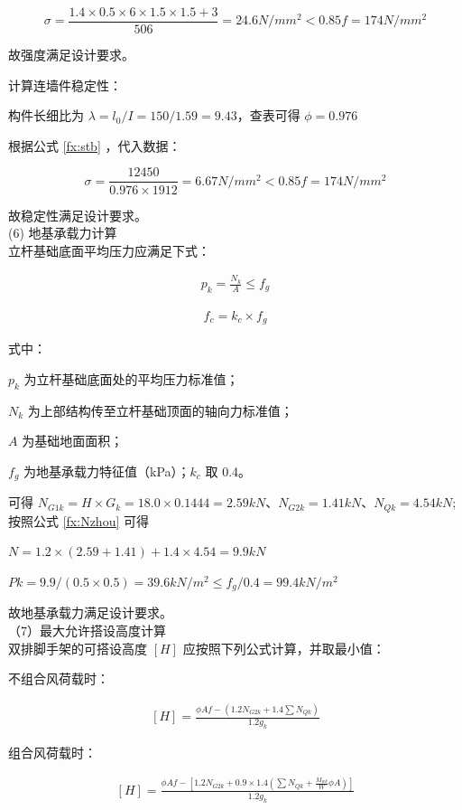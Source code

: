 $$\sigma=\frac{1.4×0.5×6×1.5×1.5+3}{506}=24.6 N/mm^2<0.85f=174 N/mm^2$$

故强度满足设计要求。

计算连墙件稳定性：

构件长细比为 $\lambda =l_0/I=150/1.59=9.43$，查表可得 $\phi=0.976$

根据公式 \ref{fx:stb} ，代入数据：

$$\sigma =\frac{12450}{0.976\times 1912}=6.67 N/mm^2<0.85f=174 N/mm^2$$

故稳定性满足设计要求。\\

(6) 地基承载力计算\\

立杆基础底面平均压力应满足下式：

\begin{align}
    p_k=\frac{N_k}{A} \leq f_g
\end{align}

\begin{align}
    f_c=k_c\times f_{g}
\end{align}

式中：

$p_k$ 为立杆基础底面处的平均压力标准值；   

$N_k$ 为上部结构传至立杆基础顶面的轴向力标准值； 

$A$ 为基础地面面积；                       

$f_g$ 为地基承载力特征值（kPa）；$k_c$ 取 0.4。

可得 $N_{G1k}=H\times G_k=18.0\times 0.1444=2.59kN$、$N_{G2k}=1.41kN$、$N_{Qk}=4.54kN$;
按照公式 \ref{fx:Nzhou} 可得

$N=1.2\times (2.59+1.41)+1.4\times 4.54=9.9kN $

$Pk=9.9/(0.5×0.5)=39.6kN/m^2\leq f_g/0.4=99.4kN/m^2$

故地基承载力满足设计要求。\\

（7）最大允许搭设高度计算\\

双排脚手架的可搭设高度 $[H]$ 应按照下列公式计算，并取最小值：

不组合风荷载时：

\begin{align}
    \label{fx:bzh} 
    [H]=\frac{\phi Af-(1.2N_{G2k}+1.4\sum N_{Qk})}{1.2g_k}
\end{align}

组合风荷载时：

\begin{align}
    \label{fx:zh} 
    [H]=\frac{\phi Af-[1.2N_{G2k}+0.9\times 1.4(\sum N_{Qk}+\frac{M_{wk}}{W}\phi A)]}{1.2g_k}
\end{align}

